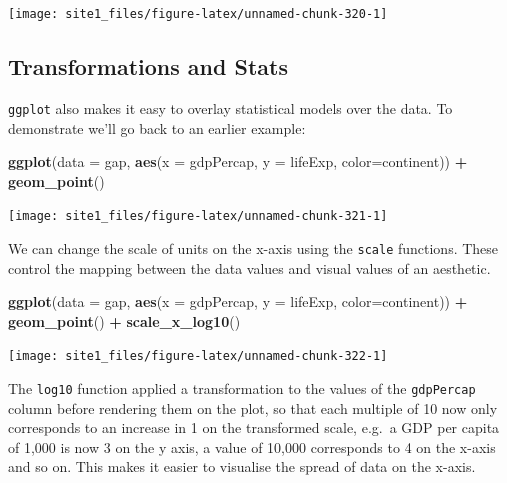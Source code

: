 \documentclass[]{book}
\newenvironment{Shaded}{\begin{snugshade}}{\end{snugshade}}
\newcommand{\KeywordTok}[1]{\textcolor[rgb]{0.13,0.29,0.53}{\textbf{#1}}}
\newcommand{\DataTypeTok}[1]{\textcolor[rgb]{0.13,0.29,0.53}{#1}}
\newcommand{\StringTok}[1]{\textcolor[rgb]{0.31,0.60,0.02}{#1}}
\newcommand{\OperatorTok}[1]{\textcolor[rgb]{0.81,0.36,0.00}{\textbf{#1}}}
\newcommand{\NormalTok}[1]{#1}
\begin{document}
\begin{center}\texttt{[image: site1\_files/figure-latex/unnamed-chunk-320-1]} \end{center}

\subsection{Transformations and Stats}\label{transformations-and-stats}

\texttt{ggplot} also makes it easy to overlay statistical models over
the data. To demonstrate we'll go back to an earlier example:

\begin{Shaded}
\begin{Highlighting}[]
\KeywordTok{ggplot}\NormalTok{(}\DataTypeTok{data =}\NormalTok{ gap, }\KeywordTok{aes}\NormalTok{(}\DataTypeTok{x =}\NormalTok{ gdpPercap, }\DataTypeTok{y =}\NormalTok{ lifeExp, }\DataTypeTok{color=}\NormalTok{continent)) }\OperatorTok{+}\StringTok{ }
\StringTok{  }\KeywordTok{geom_point}\NormalTok{()}
\end{Highlighting}
\end{Shaded}

\begin{center}\texttt{[image: site1\_files/figure-latex/unnamed-chunk-321-1]} \end{center}

We can change the scale of units on the x-axis using the \texttt{scale}
functions. These control the mapping between the data values and visual
values of an aesthetic.

\begin{Shaded}
\begin{Highlighting}[]
\KeywordTok{ggplot}\NormalTok{(}\DataTypeTok{data =}\NormalTok{ gap, }\KeywordTok{aes}\NormalTok{(}\DataTypeTok{x =}\NormalTok{ gdpPercap, }\DataTypeTok{y =}\NormalTok{ lifeExp, }\DataTypeTok{color=}\NormalTok{continent)) }\OperatorTok{+}\StringTok{ }
\StringTok{  }\KeywordTok{geom_point}\NormalTok{() }\OperatorTok{+}\StringTok{ }
\StringTok{  }\KeywordTok{scale_x_log10}\NormalTok{()}
\end{Highlighting}
\end{Shaded}

\begin{center}\texttt{[image: site1\_files/figure-latex/unnamed-chunk-322-1]} \end{center}

The \texttt{log10} function applied a transformation to the values of
the \texttt{gdpPercap} column before rendering them on the plot, so that
each multiple of 10 now only corresponds to an increase in 1 on the
transformed scale, e.g.~a GDP per capita of 1,000 is now 3 on the y
axis, a value of 10,000 corresponds to 4 on the x-axis and so on. This
makes it easier to visualise the spread of data on the x-axis.
\end{document}
